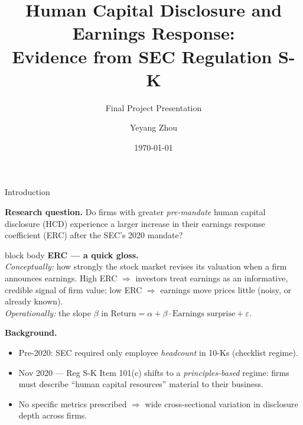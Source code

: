 \documentclass[aspectratio=169]{beamer}
\title[HC Disclosure and ERC]{Human Capital Disclosure and Earnings Response:\\Evidence from SEC Regulation S-K}
\subtitle{Final Project Presentation}
\author{Yeyang Zhou}
\institute[OU]{Econ 5253: Data Science for Economists\\University of Oklahoma}
\date{\today}
\begin{document}
\begin{frame}
  \titlepage
\end{frame}

\begin{frame}{Introduction}

\textbf{Research question.} Do firms with greater \textit{pre-mandate} human capital
disclosure (HCD) experience a larger increase in their earnings response coefficient
(ERC) after the SEC's 2020 mandate?

\vspace{4pt}

\begin{beamercolorbox}[sep=4pt,rounded=true]{block body}
{\footnotesize \textbf{ERC --- a quick gloss.}\\[2pt]
\textit{Conceptually:} how strongly the stock market revises its valuation
when a firm announces earnings. High ERC $\Rightarrow$ investors treat
earnings as an informative, credible signal of firm value; low ERC $\Rightarrow$
earnings move prices little (noisy, or already known).\\[2pt]
\textit{Operationally:} the slope $\beta$ in
$\text{Return} = \alpha + \beta \cdot \text{Earnings surprise} + \varepsilon$.}
\end{beamercolorbox}

\vspace{2pt}

\textbf{Background.}
\begin{itemize}
  \item Pre-2020: SEC required only employee \textit{headcount} in 10-Ks (checklist regime).
  \item Nov 2020 --- Reg S-K Item 101(c) shifts to a \textit{principles-based} regime:
        firms must describe ``human capital resources'' material to their business.
  \item No specific metrics prescribed $\Rightarrow$ wide cross-sectional variation
        in disclosure depth across firms.
\end{itemize}

\end{frame}
\end{document}
